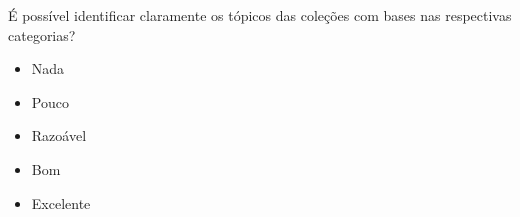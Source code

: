 \documentclass[10pt,a4paper]{article}
\begin{document}
É possível identificar claramente os tópicos das coleções com bases nas respectivas categorias?

\begin{itemize}
\item Nada
\item Pouco
\item Razoável
\item Bom
\item Excelente
\end{itemize}
\end{document}
